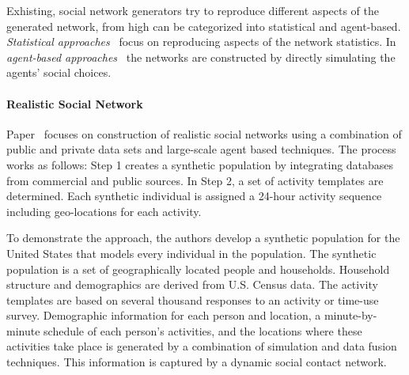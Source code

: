 Exhisting, social network generators try to reproduce different aspects of the
generated network, from high can be categorized into statistical and agent-based.
\emph{Statistical
approaches}~\cite{PhysRevE.78.046110,Yao2011,Armstrong:2013:LDB:2463676.2465296,Pham2013,Sukthankar-SocialInfo2014,Erling:2015:LSN:2723372.2742786,Nettleton2016}
focus on reproducing aspects of the network statistics. In \emph{agent-based
approaches}~\cite{Barrett:2009:GAL:1995456.1995598,Bernstein:2013:SAS:2499604.2499609}
the networks are constructed by directly simulating the agents' social choices.


\paragraph{Realistic Social Network}
Paper~\cite{Barrett:2009:GAL:1995456.1995598} focuses on construction of
realistic social networks using a combination of public and private data sets
and large-scale agent based techniques. The process works as follows: Step 1
creates a synthetic population by integrating databases from commercial and
public sources. In Step 2, a set of activity templates are determined. Each
synthetic individual is assigned a 24-hour activity sequence including
geo-locations for each activity.

To demonstrate the approach, the authors develop a synthetic population for the
United States that models every individual in the population. The synthetic
population is a set of geographically located people and households. Household
structure and demographics are derived from U.S. Census data. The activity
templates are  based on several thousand responses to an activity or time-use
survey. Demographic information for each person and location, a minute-by-minute
schedule of each person's activities, and the locations where these activities
take place is generated by a combination of simulation and data fusion
techniques. This information is captured by a dynamic social contact network.

